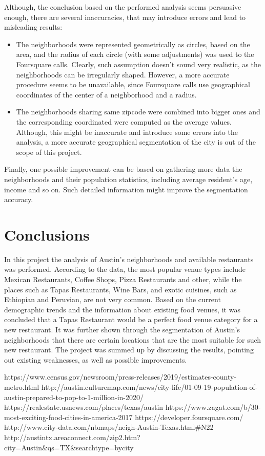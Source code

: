 \documentclass[11pt]{article}
\numberwithin{equation}{section}
\begin{document}
Although, the conclusion based on the performed analysis seems persuasive enough, there are several inaccuracies, that may introduce errors and lead to misleading results:
\begin{itemize}
\item The neighborhoods were represented geometrically as circles, based on the area, and the radius of each circle (with some adjustments) was used to the Foursquare calls. Clearly, such assumption doesn't sound very realistic, as the neighborhoods can be irregularly shaped. However, a more accurate procedure seems to be unavailable, since Foursquare calls use geographical coordinates of the center of a neighborhood and a radius.
\item The neighborhoods sharing same zipcode were combined into bigger ones and the corresponding coordinated were computed as the average values. Although, this might be inaccurate and introduce some errors into the analysis, a more accurate geographical segmentation of the city is out of the scope of this project.
\end{itemize}
Finally, one possible improvement can be based on gathering more data the neighborhoods and their population statistics, including average resident's age, income and so on. Such detailed information might improve the segmentation accuracy.
\section{Conclusions}
In this project the analysis of Austin's neighborhoods and available restaurants was performed. According to the data, the most popular venue types include Mexican Restaurants, Coffee Shops, Pizza Restaurants and other, while the places such as Tapas Restaurants, Wine Bars, and exotic cuisines, such as Ethiopian and Peruvian, are not very common. Based on the current demographic trends and the information about existing food venues, it was concluded that a Tapas Restaurant would be a perfect food venue category for a new restaurant. It was further shown through the segmentation of Austin's neighborhoods that there are certain locations that are the most suitable for such new restaurant. The project was summed up by discussing the results, pointing out existing weaknesses, as well as possible improvements. 
\begin{thebibliography}{1}
    https://www.census.gov/newsroom/press-releases/2019/estimates-county-metro.html
     http://austin.culturemap.com/news/city-life/01-09-19-population-of-austin-prepared-to-pop-to-1-million-in-2020/
     https://realestate.usnews.com/places/texas/austin
      https://www.zagat.com/b/30-most-exciting-food-cities-in-america-2017
       https://developer.foursquare.com/
       http://www.city-data.com/nbmaps/neigh-Austin-Texas.html\#N22
      http://austintx.areaconnect.com/zip2.htm?city=Austin\&qs=TX\&searchtype=bycity
  \end{thebibliography}
\end{document}
